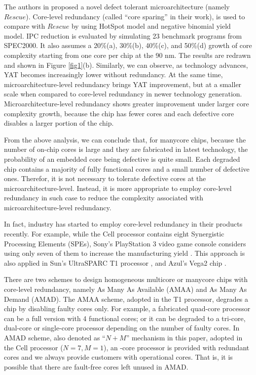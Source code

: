 The authors in \cite{schuchman2005rescue} proposed a novel defect tolerant microarchitecture (namely $Rescue$). Core-level redundancy (called “core sparing” in their work), is used to compare with $Rescue$ by using HotSpot model and negative binomial yield model. IPC reduction is evaluated by simulating 23 benchmark programs from SPEC2000. It also assumes a 20\%(a), 30\%(b), 40\%(c), and 50\%(d) growth of core complexity starting from one core per chip at the 90 nm. The results are redrawn and shown in Figure \ref{fig1}(b). Similarly, we can observe, as technology advances, YAT becomes increasingly lower without redundancy. At the same time, microarchitecture-level redundancy brings YAT improvement, but at a smaller scale when compared to core-level redundancy in newer technology generation. Microarchitecture-level redundancy shows greater improvement under larger core complexity growth, because the chip has fewer cores and each defective core disables a larger portion of the chip.

From the above analysis, we can conclude that, for manycore chips, because the number of on-chip cores is large and they are fabricated in latest technology, the probability of an embedded core being defective is quite small. Each degraded chip contains a majority of fully functional cores and a small number of defective ones. Therefor, it is not necessary to tolerate defective cores at the microarchitecture-level. Instead, it is more appropriate to employ core-level redundancy in such case to reduce the complexity associated with microarchitecture-level redundancy.

In fact, industry has started to employ core-level redundancy in their products recently. For example, while the Cell processor contains eight Synergistic Processing Elements (SPEs), Sony’s PlayStation 3 video game console considers using only seven of them to increase the manufacturing yield \cite{sperling2007turn}. This approach is also applied in Sun’s UltraSPARC T1 processor \cite{parulkar2002scalable}, \cite{tan2006testing} and Azul’s Vega2 chip \cite{makar2007testing}.

There are two schemes to design homogeneous multicore or manycore chips with core-level redundancy, namely As Many As Available (AMAA) and As Many As Demand (AMAD). The AMAA scheme, adopted in the T1 processor, degrades a chip by disabling faulty cores only. For example, a fabricated quad-core processor can be a full version with 4 functional cores; or it can be degraded to a tri-core, dual-core or single-core processor depending on the number of faulty cores. In AMAD scheme, also denoted as “$N+M$” mechanism in this paper, adopted in the Cell processor ($N=7, M=1$), an -core processor is provided with redundant cores and we always provide customers with operational cores. That is, it is possible that there are fault-free cores left unused in AMAD.

